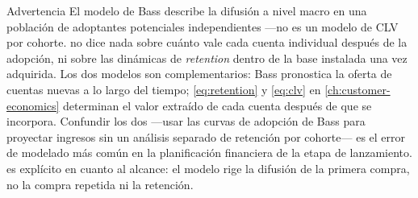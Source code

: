 \begin{admonition}{Advertencia}
El modelo de Bass describe la difusión a nivel macro en una población de adoptantes
potenciales independientes ---no es un modelo de CLV por cohorte.  no dice
nada sobre cuánto vale cada cuenta individual después de la adopción, ni sobre las
dinámicas de \emph{retention} dentro de la base instalada una vez adquirida. Los dos
modelos son complementarios: Bass pronostica la oferta de cuentas nuevas a lo largo del
tiempo; \cref{eq:retention} y \cref{eq:clv} en \cref{ch:customer-economics} determinan
el valor extraído de cada cuenta después de que se incorpora. Confundir los dos ---usar
las curvas de adopción de Bass para proyectar ingresos sin un análisis separado de
retención por cohorte--- es el error de modelado más común en la planificación financiera
de la etapa de lanzamiento. \textcite{bass1969newproduct} es explícito en cuanto al
alcance: el modelo rige la difusión de la primera compra, no la compra repetida ni la
retención.
\end{admonition}
